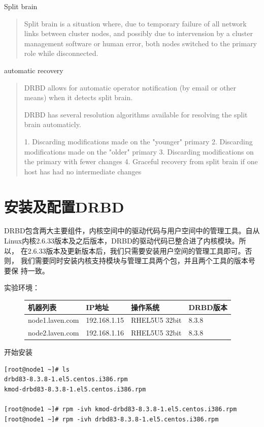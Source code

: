 Split brain
\begin{quote}
Split brain is a situation where, due to temporary failure of all
network links between cluster nodes, and possibly due to intervension
by a cluster management software or human error, both nodes switched
to the primary role while disconnected.
\end{quote}

automatic recovery
\begin{quote}
DRBD allows for automatic operator notification (by email or other
means) when it detects split brain.

DRBD has several resolution algorithms available for resolving the
split brain automaticly.

1. Discarding modifications made on the "younger" primary
2. Discarding modifications made on the "older" primary
3. Discarding modifications on the primary with fewer changes
4. Graceful recovery from split brain if one host has had no intermediate changes
\end{quote}

\section{安装及配置DRBD}

DRBD包含两大主要组件，内核空间中的驱动代码与用户空间中的管理工具。自从
Linux内核2.6.33版本及之后版本，DRBD的驱动代码已整合进了内核模块。所以，
在2.6.33版本及更新版本后，我们只需要安装用户空间的管理工具即可。否则，
我们需要同时安装内核支持模块与管理工具两个包，并且两个工具的版本号要保
持一致。

实验环境：

\begin{figure}[!h]
\centering
\begin{tabular}{llll}
\toprule
机器列表        & IP地址        & 操作系统       & DRBD版本 \\
\midrule
node1.laven.com & 192.168.1.15  & RHEL5U5 32bit  & 8.3.8 \\
node2.laven.com & 192.168.1.16  & RHEL5U5 32bit  & 8.3.8 \\
\bottomrule
\end{tabular}
\end{figure}


开始安装

\small{
\begin{verbatim}
[root@node1 ~]# ls
drbd83-8.3.8-1.el5.centos.i386.rpm
kmod-drbd83-8.3.8-1.el5.centos.i386.rpm

[root@node1 ~]# rpm -ivh kmod-drbd83-8.3.8-1.el5.centos.i386.rpm
[root@node1 ~]# rpm -ivh drbd83-8.3.8-1.el5.centos.i386.rpm
\end{verbatim}
}
\normalsize

